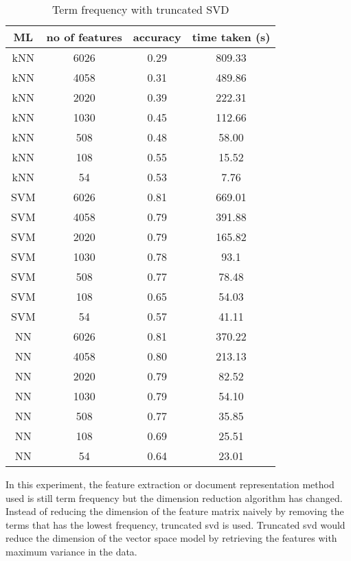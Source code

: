 \begin{table} [H]
	\centering
	\caption{Term frequency with truncated SVD}
	\label{tbl:termFrequencySvd}
	\begin{tabular}{|| c | c | c | c||}
		\hline
		ML & no of features & accuracy & time taken (s) \\ [0.5ex]
		\hline\hline
		kNN & 6026 & 0.29 & 809.33 \\
		\hline
		kNN & 4058 & 0.31 & 489.86 \\ 
		\hline
		kNN & 2020 & 0.39 & 222.31 \\ 
		\hline
		kNN & 1030 & 0.45 & 112.66 \\ 
		\hline
		kNN & 508 & 0.48 & 58.00 \\ 
		\hline
		kNN & 108 & 0.55 & 15.52 \\ 
		\hline
		kNN & 54 & 0.53 & 7.76 \\ 
		\hline\hline
		SVM & 6026 & 0.81 & 669.01 \\
		\hline
		SVM & 4058 & 0.79 & 391.88 \\
		\hline
		SVM & 2020 & 0.79 & 165.82 \\
		\hline
		SVM & 1030 & 0.78 & 93.1 \\
		\hline
		SVM & 508 & 0.77 & 78.48 \\
		\hline
		SVM & 108 & 0.65 & 54.03 \\
		\hline
		SVM & 54 & 0.57 & 41.11 \\
		\hline\hline
		NN & 6026 & 0.81 & 370.22 \\
		\hline
		NN & 4058 & 0.80 & 213.13 \\
		\hline
		NN & 2020 & 0.79 & 82.52 \\
		\hline
		NN & 1030 & 0.79 & 54.10 \\
		\hline
		NN & 508 & 0.77 & 35.85 \\
		\hline
		NN & 108 & 0.69 & 25.51 \\
		\hline
		NN & 54 & 0.64 & 23.01 \\
		\hline
	\end{tabular}
\end{table}

In this experiment, the feature extraction or document representation method used is still term frequency but the dimension reduction algorithm has changed. Instead of reducing the dimension of the feature matrix naively by removing the terms that has the lowest frequency, truncated \ac{svd} is used. Truncated \ac{svd} would reduce the dimension of the vector space model by retrieving the features with maximum variance in the data.

